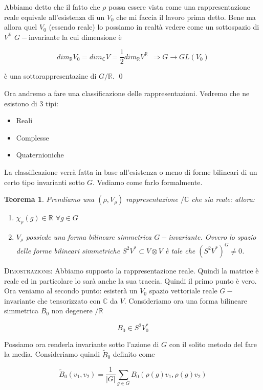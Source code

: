 \documentclass[11pt]{article}
\theoremstyle{plain}
\newtheorem{thm}{Teorema}[section]
\theoremstyle{definition}
\theoremstyle{remark}
\newcommand{\C}{\mathbb{C}}
\newcommand{\R}{\mathbb{R}}
\newcommand{\dsum}{\displaystyle\sum}
\begin{document}
Abbiamo detto che il fatto che $\rho$ possa essere vista come una rappresentazione reale equivale all'esistenza di un $V_0$ che mi faccia  il lavoro prima detto. Bene ma allora quel $V_0$ (essendo reale) lo possiamo in realtà vedere come un sottospazio di $V^{\R}$ $G-$invariante la cui dimensione è 

\[dim_\R V_0=dim_\C V=\frac{1}{2}dim_{\R} V^{\R}\ \ \Rightarrow G\rightarrow GL(V_0) \]

è una sottorappresentazine di $G/\R$.  \qed

Ora andremo a fare una classificazione delle rappresentazioni. Vedremo che ne esistono di 3 tipi:
\begin{itemize}
\item Reali
\item Complesse
\item Quaternioniche
\end{itemize}



La classificazione verrà fatta in base all'esistenza o meno di forme bilineari di un certo tipo invarianti sotto $G$. Vediamo come farlo formalmente.


\begin{thm}

Prendiamo una $(\rho, V_\rho)$ rappresentazione $/\C$ che sia reale: allora:
\begin{enumerate}
\item $\chi_\rho(g)\in \R$ $\forall g\in G$ 
\item $V_\rho$ possiede una forma bilineare simmetrica $G-$invariante. Ovvero lo spazio delle forme bilineari simmetriche $S^2V^*\subset V\otimes V$ è tale che $(S^2V^*)^G\neq 0$.
\end{enumerate} 

\end{thm}

\textsc{Dimostrazione:} Abbiamo supposto la rappresentazione reale. Quindi la matrice è reale ed in particolare lo sarà anche la sua traccia. Quindi il primo punto è vero. Ora veniamo al secondo punto: esisterà un $V_0$ spazio vettoriale reale $G-$invariante che tensorizzato con $\C$ da $V$. Consideriamo ora una forma bilineare simmetrica $B_0$ non degenere $/\R$

\[ B_0 \in S^2 V_0^*\]

Possiamo ora renderla invariante sotto l'azione di $G$ con il solito metodo del fare la media. Consideriamo quindi $\tilde B_0$ definito come


\[ \tilde B_0(v_1, v_2) = \dfrac{1}{|G|} \dsum_{g\in G} B_0(\rho(g) v_1, \rho(g) v_2)\]
\end{document}
